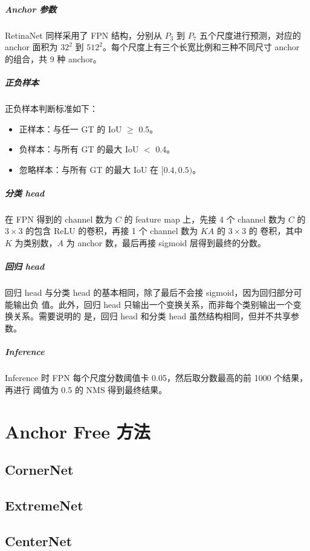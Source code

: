 \paragraph{Anchor 参数}
RetinaNet 同样采用了 FPN 结构，分别从 $P_3$ 到 $P_7$ 五个尺度进行预测，对应的
anchor 面积为 $32^2$ 到 $512^2$。每个尺度上有三个长宽比例和三种不同尺寸 anchor
的组合，共 9 种 anchor。

\paragraph{正负样本}
正负样本判断标准如下：
\begin{itemize}
\item 正样本：与任一 GT 的 IoU $\geq$ 0.5。
\item 负样本：与所有 GT 的最大 IoU $ < $ 0.4。
\item 忽略样本：与所有 GT 的最大 IoU 在 $[0.4, 0.5)$。
\end{itemize}

\paragraph{分类 head}
在 FPN 得到的 channel 数为 $C$ 的 feature map 上，先接 4 个 channel 数为 $C$ 的
$3 \times 3$ 的包含 ReLU 的卷积，再接 1 个 channel 数为 $KA$ 的 $3 \times 3$ 的
卷积，其中 $K$ 为类别数，$A$ 为 anchor 数，最后再接 sigmoid 层得到最终的分数。

\paragraph{回归 head}
回归 head 与分类 head 的基本相同，除了最后不会接 sigmoid，因为回归部分可能输出负
值。此外，回归 head 只输出一个变换关系，而非每个类别输出一个变换关系。需要说明的
是，回归 head 和分类 head 虽然结构相同，但并不共享参数。

\paragraph{Inference}
Inference 时 FPN 每个尺度分数阈值卡 0.05，然后取分数最高的前 1000 个结果，再进行
阈值为 0.5 的 NMS 得到最终结果。

\chapter{Anchor Free 方法}

\section{CornerNet}
\label{sec:CornerNet}

\section{ExtremeNet}
\label{sec:ExtremeNet}

\section{CenterNet}
\label{sec:CenterNet}



